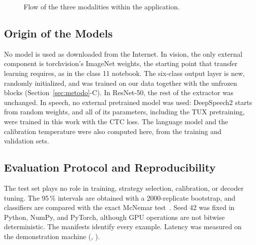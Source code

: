 \begin{figure}[t]
\centering
{}
\caption{Flow of the three modalities within the application.}
\label{fig:architecture}
\end{figure}

\subsection{Origin of the Models}
No model is used as downloaded from the Internet. In vision, the only external component is torchvision's ImageNet weights, the starting point that transfer learning requires, as in the class 11 notebook. The six-class output layer is new, randomly initialized, and was trained on our data together with the unfrozen blocks (Section~\ref{sec:metodo}-C). In ResNet-50, the rest of the extractor was unchanged. In speech, no external pretrained model was used: DeepSpeech2 starts from random weights, and all of its parameters, including the TUX pretraining, were trained in this work with the CTC loss. The language model and the calibration temperature were also computed here, from the training and validation sets.

\subsection{Evaluation Protocol and Reproducibility}
The test set plays no role in training, strategy selection, calibration, or decoder tuning. The 95\,\% intervals are obtained with a 2000-replicate bootstrap, and classifiers are compared with the exact McNemar test~\cite{mcnemar}. Seed 42 was fixed in Python, NumPy, and PyTorch, although GPU operations are not bitwise deterministic. The manifests identify every example. Latency was measured on the demonstration machine (\HwCpu{}, \HwGpu{}).
